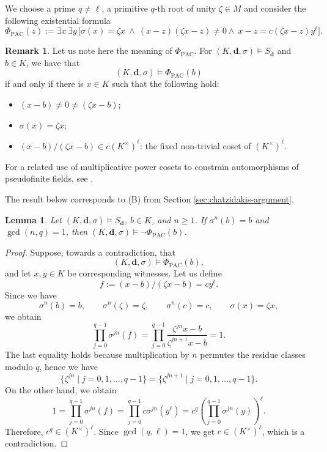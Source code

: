 \documentclass[11pt,a4paper]{amsart}
\renewcommand{\ge}{\geqslant}
\newtheorem{lemma}[theorem]{Lemma}
\theoremstyle{definition}
\newtheorem{remark}[theorem]{Remark}
\newcommand{\bd}{\boldsymbol d}
\begin{document}
We choose a prime $q\ne\ell$, a primitive $q$-th root of unity
$\zeta\in M$ and consider the following existential formula
\[
\Phi_{\mathrm{PAC}}(z):=\exists x\,\exists y\,\bigl[
\sigma(x)=\zeta x
\ \land\ (x-z)(\zeta x-z)\ne0
\land\ x-z=c(\zeta x-z)y^\ell
\bigr].
\]
\begin{remark}\label{meaning}
Let us note here the meaning of $\Phi_{\mathrm{PAC}}$. For $(K,\bd,\sigma)\models S_{\bd}$ and $b\in K$, we have that
\[
(K,\bd,\sigma)\models \Phi_{\mathrm{PAC}}(b)
\]
if and only if there is $x\in K$ such that the following hold:
\begin{itemize}
  \item $(x-b)\neq 0\neq (\zeta x-b)$;

  \item $\sigma(x)=\zeta x$;

  \item $(x-b)/(\zeta x-b)\in c(K^\times)^\ell$: the fixed non-trivial coset of $(K^\times)^\ell$.
\end{itemize}
\end{remark}
For a related use of multiplicative power cosets to constrain
automorphisms of pseudofinite fields, see
\cite[Section~4]{BHAlgClosure}.

The result below corresponds to (B) from Section \ref{sec:chatzidakis-argument}.
\begin{lemma}\label{b:lem:period}
Let $(K,\bd,\sigma)\models S_{\bd}$, $b\in K$,
and $n\ge1$. If $\sigma^n(b)=b$
and $\gcd(n,q)=1$, then
$(K,\bd,\sigma)\models\neg\Phi_{\mathrm{PAC}}(b)$.
\end{lemma}

\begin{proof}Suppose, towards a contradiction, that
\[
(K,\bd,\sigma)\models\Phi_{\mathrm{PAC}}(b),
\]
and let $x,y\in K$ be corresponding witnesses. Let us define
\[
f:=(x-b)/(\zeta x-b)=cy^\ell.
\]
Since we have
\[
\sigma^n(b)=b,\qquad \sigma^n(\zeta)=\zeta,\qquad \sigma^n(c)=c,\qquad \sigma(x)=\zeta x,
\]
we obtain
\[
\prod_{j=0}^{q-1}\sigma^{jn}(f)
=\prod_{j=0}^{q-1}
  \frac{\zeta^{jn}x-b}{\zeta^{jn+1}x-b}
=1.
\]
The last equality holds because multiplication by $n$ permutes the
residue classes modulo $q$, hence we have
\[
\{\zeta^{jn}\mid j=0,1,\ldots,q-1\}=\{\zeta^{jn+1}\mid j=0,1,\ldots,q-1\}.
\]
On the other hand, we obtain
\[
1=\prod_{j=0}^{q-1}\sigma^{jn}(f)
=\prod_{j=0}^{q-1}c\sigma^{jn}\left(y^\ell\right)
=c^q\left(\prod_{j=0}^{q-1}\sigma^{jn}(y)\right)^\ell.
\]
Therefore, $c^q\in (K^\times)^\ell$. Since $\gcd(q,\ell)=1$, we get $c\in (K^\times)^\ell$, which is a contradiction.
\end{proof}
\end{document}
